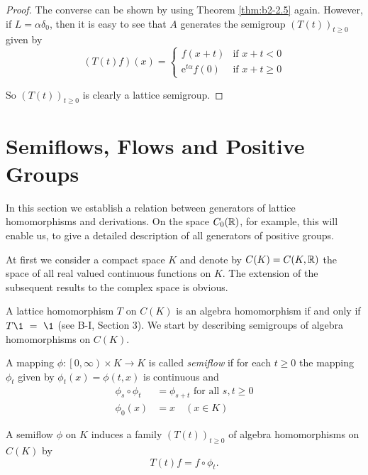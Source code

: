 \begin{proof}
The converse can be shown by using Theorem \ref{thm:b2-2.5} again.
However, if $L = \alpha\delta_{0}$, then it is easy to see that $A$ generates the semigroup $(T(t))_{t \geq 0}$ given by
\begin{equation*}
(T(t)f)(x) = \begin{cases}
    f(x+t) & \text{if } x+t < 0 \\
    \mathrm{e}^{t\alpha}f(0) & \text{if } x+t \geq 0
\end{cases}
\end{equation*}

So $(T(t))_{t \geq 0}$ is clearly a lattice semigroup.
\end{proof}


\section{Semiflows, Flows and Positive Groups}\label{sec:b2-3}

In this section we establish a relation between generators of lattice homomorphisms and derivations.
On the space $C_{0}(\mathbb{R})$, for example, this will enable us, to give a detailed description of all generators of positive groups.

At first we consider a compact space $K$ and denote by $C(K) = C(K,\mathbb{R})$ the space of all real valued continuous functions on $K$.
The extension of the subsequent results to the complex space is obvious.

A lattice homomorphism $T$ on $C(K)$ is an algebra homomorphism if and only if $T \1~=~\1$ (see B-I, Section 3).
We start by describing semigroups of algebra homomor\-phisms on $C(K)$.

\begin{definition}\label{def:b2-3.1}
A mapping $\phi \colon \left[0,\infty\right) \times K \to K$ is called \emph{semiflow} if for each $t \geq 0$ the mapping $\phi_{t}$ given by $\phi_{t}(x) = \phi(t,x)$ is continuous and
\begin{align}
\phi_{s} \circ \phi_{t} &= \phi_{s+t} \text{ for all } s,t \geq 0 \label{eq:b2-3.1} \\
\phi_{0}(x) &= x \quad (x \in K) \label{eq:b2-3.2}
\end{align}
\end{definition}

A semiflow $\phi$ on $K$ induces a family $(T(t))_{t \geq 0}$ of algebra homomorphisms on $C(K)$ by
\begin{equation}\label{eq:b2-3.3}
T(t)f = f \circ \phi_{t}.
\end{equation}

